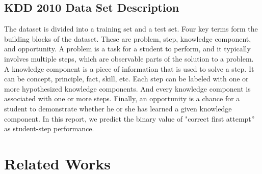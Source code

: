 \documentclass{article} %
\begin{document}





\subsection{KDD 2010 Data Set Description}

The dataset is divided into a training set and a test set. Four key terms form the building blocks of the dataset. These are problem, step, knowledge component, and opportunity. A problem is a task for a student to perform, and it typically involves multiple steps, which are observable parts of the solution to a problem. A knowledge component is a piece of information that is used to solve a step. It can be concept, principle, fact, skill, etc. Each step can be labeled with one or more hypothesized knowledge components. And every knowledge component is associated with one or more steps. Finally, an opportunity is a chance for a student to demonstrate whether he or she has learned a given knowledge component. In this report, we predict the binary value of "correct first attempt'' as student-step performance.

\section{Related Works}
\label{gen_inst}
\end{document}
